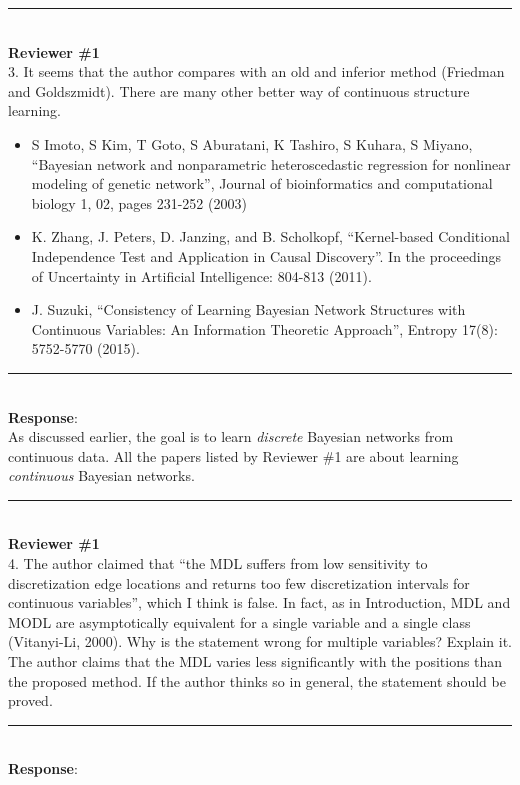 \documentclass{article}
\begin{document}
\noindent\rule{8cm}{0.4pt}\\
{\bf Reviewer \#1} \\

3. It seems that  the author compares with an old and inferior method (Friedman and Goldszmidt).
There are many other better way of continuous structure learning.

\begin{itemize}
\item S Imoto, S Kim, T Goto, S Aburatani, K Tashiro, S Kuhara, S Miyano, ``Bayesian  network and nonparametric heteroscedastic regression for nonlinear modeling of  genetic network'', Journal of bioinformatics and computational biology 1, 02,  pages 231-252 (2003)
\item K. Zhang, J. Peters, D. Janzing, and B. Scholkopf, ``Kernel-based Conditional Independence Test and  Application in Causal Discovery''. In the proceedings of Uncertainty in Artificial Intelligence: 804-813 (2011).
\item J. Suzuki, ``Consistency of Learning Bayesian Network Structures with Continuous Variables: An Information  Theoretic Approach'', Entropy 17(8): 5752-5770 (2015).
\end{itemize}

\noindent\rule{8cm}{0.4pt}\\
{\bf Response}:\\

As discussed earlier, the goal is to learn \textit{discrete} Bayesian networks from continuous data.
All the papers listed by Reviewer \#1 are about learning \textit{continuous} Bayesian networks.

\noindent\rule{8cm}{0.4pt}\\
{\bf Reviewer \#1} \\

4. The author claimed that ``the MDL suffers from low sensitivity to discretization edge locations and returns too few discretization intervals for continuous variables'', which I think is false. In fact, as in Introduction, MDL and MODL are asymptotically equivalent for a single variable and a single class  (Vitanyi-Li, 2000).  Why is the statement wrong for multiple variables? Explain it. The author claims that the MDL varies less significantly with the positions than the proposed method.  If the author thinks so in general, the statement should be proved.

\noindent\rule{8cm}{0.4pt}\\
{\bf Response}:\\
\end{document}
